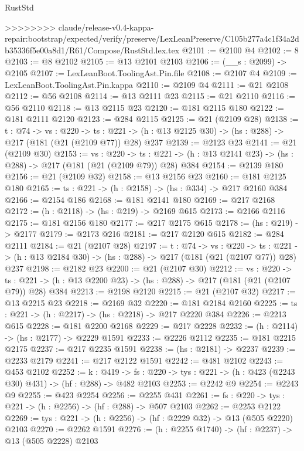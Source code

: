 \begin{lexlean}{RustStd}
\begin{coremodule}
{\begin{coremodule}
{{{{{{{{{{{{{{{{{>>>>>>>> claude/release-v0.4-kappa-repair:bootstrap/expected/verify/preserve/LexLeanPreserve/C105b277a4c1f34a2db35336f5e00a8d1/R61/Compose/RustStd.lex.tex
@2101 := @2100 @4
@2102 := 8
@2103 := @8 @2102
@2105 := @13 @2101 @2103
@2106 := (__s : @2099) -> @2105
@2107 := LexLeanBoot.ToolingAst.Pin.file
@2108 := @2107 @4
@2109 := LexLeanBoot.ToolingAst.Pin.kappa
@2110 := @2109 @4
@2111 := @21 @2108
@2112 := @56 @2108
@2114 := @13 @2111 @23
@2115 := @21 @2110
@2116 := @56 @2110
@2118 := @13 @2115 @23
@2120 := @181 @2115 @180
@2122 := @181 @2111 @2120
@2123 := @284 @2115
@2125 := @21 (@2109 @28)
@2138 := {t : @74} ->
  {vs : @220} ->
  {ts : @221} -> (h : @13 @2125 @30) -> (hs : @288) -> @217 (@181 (@21 (@2109 @77)) @28) @237
@2139 := @2123 @23
@2141 := @21 (@2109 @30)
@2153 := {vs : @220} ->
  {ts : @221} -> (h : @13 @2141 @23) -> (hs : @288) -> @217 (@181 (@21 (@2109 @79)) @28) @384
@2154 := @2139 @180
@2156 := @21 (@2109 @32)
@2158 := @13 @2156 @23
@2160 := @181 @2125 @180
@2165 := {ts : @221} -> (h : @2158) -> (hs : @334) -> @217 @2160 @384
@2166 := @2154 @186
@2168 := @181 @2141 @180
@2169 := @217 @2168
@2172 := (h : @2118) -> (hs : @219) -> @2169 @615
@2173 := @2166 @2116
@2175 := @181 @2156 @180
@2177 := @217 @2175 @615
@2178 := (hs : @219) -> @2177
@2179 := @2173 @216
@2181 := @217 @2120 @615
@2182 := @284 @2111
@2184 := @21 (@2107 @28)
@2197 := {t : @74} ->
  {vs : @220} ->
  {ts : @221} -> (h : @13 @2184 @30) -> (hs : @288) -> @217 (@181 (@21 (@2107 @77)) @28) @237
@2198 := @2182 @23
@2200 := @21 (@2107 @30)
@2212 := {vs : @220} ->
  {ts : @221} -> (h : @13 @2200 @23) -> (hs : @288) -> @217 (@181 (@21 (@2107 @79)) @28) @384
@2213 := @2198 @2120
@2215 := @21 (@2107 @32)
@2217 := @13 @2215 @23
@2218 := @2169 @32
@2220 := @181 @2184 @2160
@2225 := {ts : @221} -> (h : @2217) -> (hs : @2218) -> @217 @2220 @384
@2226 := @2213 @615
@2228 := @181 @2200 @2168
@2229 := @217 @2228
@2232 := (h : @2114) -> (hs : @2177) -> @2229 @1591
@2233 := @2226 @2112
@2235 := @181 @2215 @2175
@2237 := @217 @2235 @1591
@2238 := (hs : @2181) -> @2237
@2239 := @2233 @2179
@2241 := @217 @2122 @1591
@2242 := @481 @2102
@2243 := @453 @2102
@2252 := {k : @419} ->
  {fs : @220} -> {tys : @221} -> (h : @423 (@2243 @30) @431) -> (hf : @288) -> @482 @2103
@2253 := @2242 @9
@2254 := @2243 @9
@2255 := @423 @2254
@2256 := @2255 @431
@2261 := {fs : @220} -> {tys : @221} -> (h : @2256) -> (hf : @288) -> @507 @2103
@2262 := @2253 @2122
@2269 := {tys : @221} -> (h : @2256) -> (hf : @2229 @32) -> @13 (@505 @2220) @2103
@2270 := @2262 @1591
@2276 := (h : @2255 @1740) -> (hf : @2237) -> @13 (@505 @2228) @2103
}}}}}}}}}}}}}}}}}
\end{coremodule}}
\end{coremodule}
\end{lexlean}
